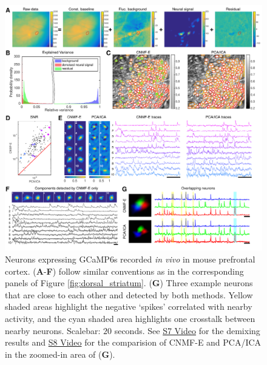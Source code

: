 \documentclass[9pt,lineno]{elife}
\begin{document}
\begin{figure}[!t]
  \centering
  \includegraphics[width=1\textwidth]{Fig_PFC.pdf}
  \caption{Neurons expressing GCaMP6s  recorded \emph{in vivo} in mouse prefrontal cortex. (\textbf{A}-\textbf{F}) follow similar conventions as in the corresponding panels of Figure \ref{fig:dorsal_striatum}. (\textbf{G}) Three example neurons that are close to each other and detected by both methods. Yellow shaded areas highlight the negative `spikes' correlated with nearby activity, and the cyan shaded area highlights one crosstalk between nearby neurons. Scalebar: $20$ seconds.  See \href{http://www.columbia.edu/~pz2230/videos/pfc_demixing.mp4}{S7 Video} for the demixing results and \href{http://www.columbia.edu/~pz2230/videos/pfc_overlapping.mp4}{S8 Video} for the comparision of CNMF-E and PCA/ICA in the zoomed-in area of (\textbf{G}).}
  \label{fig:pfc}
\end{figure}
\end{document}

